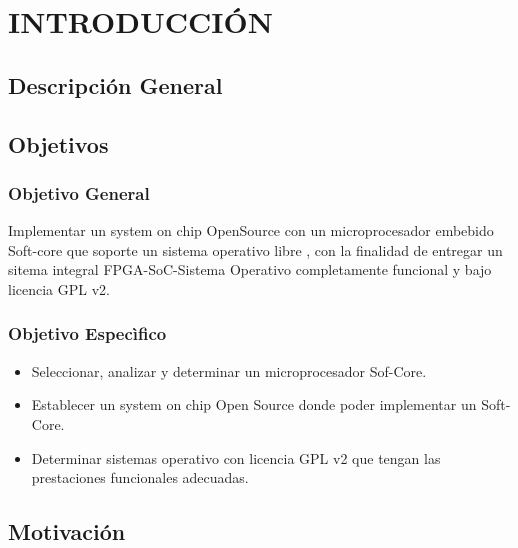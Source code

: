 \chapter{INTRODUCCIÓN}


\section{Descripción General}



\section{Objetivos}
\subsection{Objetivo General}

Implementar un system on chip OpenSource con un microprocesador embebido Soft-core que soporte un sistema operativo libre , con la finalidad de entregar un sitema integral FPGA-SoC-Sistema Operativo completamente funcional y bajo licencia GPL v2.

\subsection{Objetivo Especìfico}
\begin{itemize}
\item Seleccionar, analizar y determinar un microprocesador Sof-Core.
\item Establecer un system on chip Open Source donde poder implementar un Soft-Core.
\item Determinar sistemas operativo con licencia GPL v2 que tengan las prestaciones funcionales adecuadas.
\end{itemize}

\section{Motivación} 

